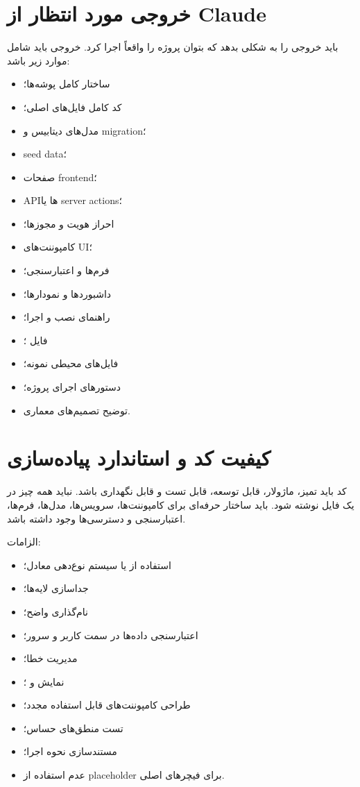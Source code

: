 \documentclass[12pt,a4paper]{article}
\begin{document}
\section{خروجی مورد انتظار از Claude}
 باید خروجی را به شکلی بدهد که بتوان پروژه را واقعاً اجرا کرد. خروجی باید شامل موارد زیر باشد:
\begin{itemize}
\item ساختار کامل پوشه‌ها؛
\item کد کامل فایل‌های اصلی؛
\item مدل‌های دیتابیس و migration؛
\item seed data؛
\item صفحات frontend؛
\item APIها یا server actions؛
\item احراز هویت و مجوزها؛
\item کامپوننت‌های UI؛
\item فرم‌ها و اعتبارسنجی؛
\item داشبوردها و نمودارها؛
\item راهنمای نصب و اجرا؛
\item فایل ؛
\item فایل‌های محیطی نمونه؛
\item دستورهای اجرای پروژه؛
\item توضیح تصمیم‌های معماری.
\end{itemize}

\section{کیفیت کد و استاندارد پیاده‌سازی}
کد باید تمیز، ماژولار، قابل توسعه، قابل تست و قابل نگهداری باشد. نباید همه چیز در یک فایل نوشته شود. باید ساختار حرفه‌ای برای کامپوننت‌ها، سرویس‌ها، مدل‌ها، فرم‌ها، اعتبارسنجی و دسترسی‌ها وجود داشته باشد.

الزامات:
\begin{itemize}
\item استفاده از  یا سیستم نوع‌دهی معادل؛
\item جداسازی لایه‌ها؛
\item نام‌گذاری واضح؛
\item اعتبارسنجی داده‌ها در سمت کاربر و سرور؛
\item مدیریت خطا؛
\item نمایش  و ؛
\item طراحی کامپوننت‌های قابل استفاده مجدد؛
\item تست منطق‌های حساس؛
\item مستندسازی نحوه اجرا؛
\item عدم استفاده از placeholder برای فیچرهای اصلی.
\end{itemize}
\end{document}

